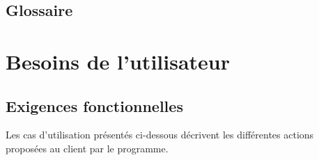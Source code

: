 \documentclass[a4paper,titlepage]{scrreprt}
\begin{document}
\section{Glossaire}
  \removepagebreak
  \printglossaries
  \restorepagebreak
\chapter{Besoins de l'utilisateur}
  
  
\section{Exigences fonctionnelles}
  
  Les cas d'utilisation présentés ci-dessous décrivent les différentes actions proposées au client par le programme.
\end{document}
